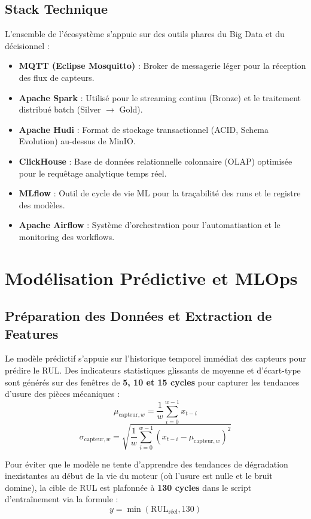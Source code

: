 \documentclass[12pt]{report}
\begin{document}
\section{Stack Technique}
L'ensemble de l'écosystème s'appuie sur des outils phares du Big Data et du décisionnel :
\begin{itemize}
    \item \textbf{MQTT (Eclipse Mosquitto)} : Broker de messagerie léger pour la réception des flux de capteurs.
    \item \textbf{Apache Spark} : Utilisé pour le streaming continu (Bronze) et le traitement distribué batch (Silver $\rightarrow$ Gold).
    \item \textbf{Apache Hudi} : Format de stockage transactionnel (ACID, Schema Evolution) au-dessus de MinIO.
    \item \textbf{ClickHouse} : Base de données relationnelle colonnaire (OLAP) optimisée pour le requêtage analytique temps réel.
    \item \textbf{MLflow} : Outil de cycle de vie ML pour la traçabilité des runs et le registre des modèles.
    \item \textbf{Apache Airflow} : Système d'orchestration pour l'automatisation et le monitoring des workflows.
\end{itemize}


\chapter{Modélisation Prédictive et MLOps}

\section{Préparation des Données et Extraction de Features}
Le modèle prédictif s'appuie sur l'historique temporel immédiat des capteurs pour prédire le RUL. Des indicateurs statistiques glissants de moyenne et d'écart-type sont générés sur des fenêtres de \textbf{5, 10 et 15 cycles} pour capturer les tendances d'usure des pièces mécaniques :
\begin{equation}
\mu_{\text{capteur}, w} = \frac{1}{w}\sum_{i=0}^{w-1} x_{t-i}
\end{equation}
\begin{equation}
\sigma_{\text{capteur}, w} = \sqrt{\frac{1}{w}\sum_{i=0}^{w-1} (x_{t-i} - \mu_{\text{capteur}, w})^2}
\end{equation}

Pour éviter que le modèle ne tente d'apprendre des tendances de dégradation inexistantes au début de la vie du moteur (où l'usure est nulle et le bruit domine), la cible de RUL est plafonnée à \textbf{130 cycles} dans le script d'entraînement via la formule :
\begin{equation}
y = \min(\text{RUL}_{\text{réel}}, 130)
\end{equation}
\end{document}
